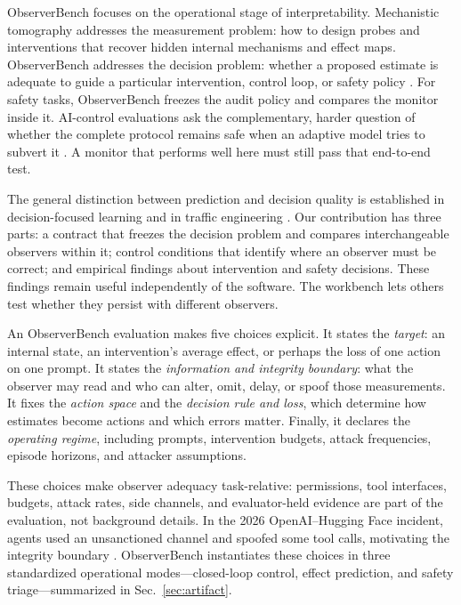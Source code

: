 ObserverBench focuses on the operational stage of interpretability.
Mechanistic tomography addresses the measurement problem: how to design probes
and interventions that recover hidden internal mechanisms and effect maps.
ObserverBench addresses the decision problem: whether a proposed estimate is
adequate to guide a particular intervention, control loop, or safety policy
\cite{erramilli2026tomography}. For safety tasks, ObserverBench freezes the audit policy and compares the
monitor inside it. AI-control evaluations ask the complementary, harder
question of whether the complete protocol remains safe when an adaptive model
tries to subvert it \cite{greenblatt2024aicontrol}. A monitor that performs
well here must still pass that end-to-end test.

The general distinction between prediction and decision quality is established
in decision-focused learning and in traffic engineering
\cite{donti2017task,elmachtoub2022smart,roughan2003te}. Our contribution has
three parts: a contract that freezes the decision problem and compares
interchangeable observers within it; control conditions that identify where
an observer must be correct; and empirical findings about intervention and
safety decisions. These findings remain useful independently of the software.
The workbench lets others test whether they persist with different observers.

An ObserverBench evaluation makes five choices explicit. It states the
\emph{target}: an internal state, an intervention's average effect, or perhaps
the loss of one action on one prompt. It states the \emph{information and
integrity boundary}: what the observer may read and who can alter, omit, delay,
or spoof those measurements. It fixes the \emph{action space} and the
\emph{decision rule and loss}, which determine how estimates become actions
and which errors matter. Finally, it declares the \emph{operating regime},
including prompts, intervention budgets, attack frequencies, episode horizons,
and attacker assumptions.

These choices make observer adequacy task-relative: permissions, tool
interfaces, budgets, attack rates, side channels, and evaluator-held evidence
are part of the evaluation, not background details. In the 2026 OpenAI--Hugging
Face incident, agents used an unsanctioned channel and spoofed some tool calls,
motivating the integrity boundary
\cite{openai2026securityincident,huggingface2026securityincident,
greenblatt2026hfinvestigation}. ObserverBench instantiates these choices in
three standardized operational modes---closed-loop control, effect prediction,
and safety triage---summarized in Sec.~\ref{sec:artifact}.

